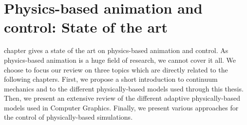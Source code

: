 \chapter{Physics-based animation and control: State of the art}
\label{chap:star}

 chapter gives a state of the art on physics-based animation and control.
As physics-based animation is a huge field of research, we cannot cover it all.
We choose to focus our review on three topics which are directly related to the following chapters.
First, we propose a short introduction to continuum mechanics and to the different physically-based models used through this thesis.
Then, we present an extensive review of the different adaptive physically-based models used in Computer Graphics.
Finally, we present various approaches for the control of physically-based simulations.


%
%


